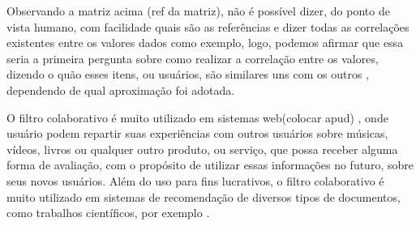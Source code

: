 \documentclass[12pt,
				openright,
				twoside,
				a4paper,
				apter=TITLE,
				section=TITLE,
				subsection=TITLE,
				chapter=TITLE,
				english,
				brazil]{abntex2}
\newcommand{\mc}[3]{\multicolumn{#1}{#2}{#3}}
\begin{document}
{%
}%

Observando a matriz acima (ref da matriz), não é possível dizer, do ponto de vista humano, com facilidade quais são as referências e dizer todas as correlações existentes entre os valores dados como exemplo, logo, podemos afirmar que essa seria a primeira pergunta sobre como realizar a correlação entre os valores, dizendo o quão esses itens, ou usuários, são similares uns com os outros \cite{ricci2011introduction}, dependendo de qual aproximação foi adotada.

O filtro colaborativo é muito utilizado em sistemas web(colocar apud) \cite{turban2009electronic}, onde usuário podem repartir suas experiências com outros usuários sobre músicas, vídeos, livros ou qualquer outro produto, ou serviço, que possa receber alguma forma de avaliação, com o propósito de utilizar essas informações no futuro, sobre seus novos usuários. Além do uso para fins lucrativos, o filtro colaborativo é muito utilizado em sistemas de recomendação de diversos tipos de documentos, como trabalhos científicos, por exemplo \cite{sun2010new}. 
\end{document}
